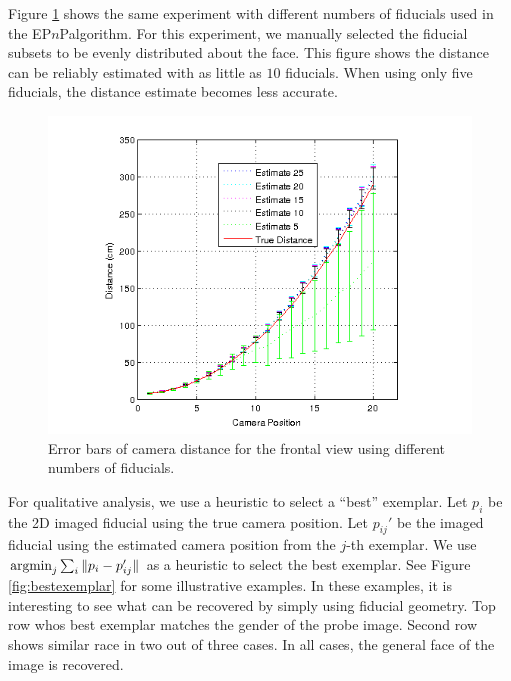 \documentclass[runningheads]{llncs}
\newcommand{\argmin}{\operatornamewithlimits{argmin}}
\newcommand {\EPnP} {EP$n$P}
\begin{document}
Figure \ref{fig:error_bar_frontal_lessfiducials} shows the same experiment with different numbers of fiducials used in the \EPnP algorithm.  For this experiment, we manually selected the fiducial subsets to be evenly distributed about the face.  This figure shows the distance can be reliably estimated with as little as $10$ fiducials.  When using only five fiducials, the distance estimate becomes less accurate.  

\begin{figure}[h]
\centering
\includegraphics[width=.7\linewidth]{resources/figures/errorbar_frontal_lessfiducials.png}
\caption{Error bars of camera distance for the frontal view using different numbers of fiducials.}
\label{fig:error_bar_frontal_lessfiducials}
\end{figure}

For qualitative analysis, we use a heuristic to select a ``best'' exemplar.  Let $p_i$ be the 2D imaged fiducial using the true camera position.  
Let $p_{ij}'$ be the imaged fiducial using the estimated camera position from the $j$-th exemplar.
We use $\argmin_j \sum_i \|p_i - p_{ij}'\|$ as a heuristic to select the best exemplar. 
See Figure \ref{fig:bestexemplar} for some illustrative examples.  
In these examples, it is interesting to see what can be recovered by simply using fiducial geometry.  
Top row whos best exemplar matches the gender of the probe image.  
Second row shows similar race in two out of three cases.  
In all cases, the general face of the image is recovered.
\end{document}
